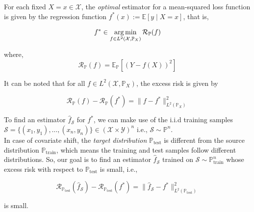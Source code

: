 \begin{example}[Regression] For each fixed $X = x \in \mathcal{X}$, the \emph{optimal} estimator for a mean-squared loss function is given by the regression function $f^*(x) := \mathbb{E}[y \mid X=x]$, that is,

\begin{equation}
    f^* \in \operatorname*{arg\,min}_{f \in L^2(\mathcal{X}, \mathbb{P}_{X})} \mathcal{R}_{\mathbb{P}}(f)
    \label{eqn:4.7}
\end{equation}

where,
\begin{equation}
    \mathcal{R}_{\mathbb{P}}(f) = \mathbb{E}_{\mathbb{P}}[(Y - f(X))^2]
    \label{eqn:4.8}
\end{equation}

It can be noted that for all $f \in L^2(\mathcal{X}, \mathbb{P}_{X})$, the excess risk is given by

\begin{equation}
    \mathcal{R}_{\mathbb{P}}(f) - \mathcal{R}_{\mathbb{P}}(f^*) = \lVert f - f^* \rVert_{L^2(\mathbb{P}_{X})}^2
    \label{eqn:4.9}
\end{equation}

To find an estimator $\hat{f}_\mathcal{S}$ for $f^*$, we can make use of the i.i.d training samples $\mathcal{S} = \{(x_1, y_1), \ldots, (x_n, y_n) \} \in (\mathcal{X} \times \mathcal{Y})^n$ i.e., $\mathcal{S} \sim \mathbb{P}^n$.\\

In case of covariate shift, the \emph{target distribution} $\mathbb{P}_{\text{test}}$ is different from the source distribution $\mathbb{P}_{\text{train}}$, which means the training and test samples follow different distributions. So, our goal is to find an estimator $\hat{f}_\mathcal{S}$ trained on $\mathcal{S} \sim \mathbb{P}_{\text{train}}^n$ whose excess risk with respect to $\mathbb{P}_{\text{test}}$ is small, i.e.,

\begin{equation}
    \mathcal{R}_{\mathbb{P}_{\text{test}}}(\hat{f}_{\mathcal{S}}) - \mathcal{R}_{\mathbb{P}_{\text{test}}}(f^*) = \lVert \hat{f}_{\mathcal{S}} - f^* \rVert_{L^2(\mathbb{P}_{\text{test}})}^2
    \label{eqn:4.10}
\end{equation}


is small.\\
\end{example}

